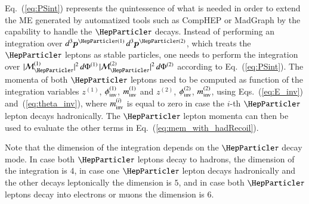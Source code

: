 Eq.~(\ref{eq:PSint}) represents the quintessence of what is needed 
in order to extend the ME generated by automatized tools such as
CompHEP or MadGraph
by the capability to handle the $\Pgt$ decays.
Instead of performing an integration over $d^{3}\bm{p}^{\Pgt(1)} \,
d^{3}\bm{p}^{\Pgt(2)}$, which treats the $\Pgt$ leptons as stable particles,
one needs to perform the integration over $\vert
\mathcal{M}^{(1)}_{\Pgt} \vert^{2} \, d\Phi^{(1)} \, \vert
\mathcal{M}^{(2)}_{\Pgt} \vert^{2} \, d\Phi^{(2)}$ according to
Eq.~(\ref{eq:PSint}).
The momenta of both $\Pgt$ leptons need to be computed as
function of the integration variables $z^{(1)}$, $\phi_{\textrm{inv}}^{(1)}$,
$m_{\textrm{inv}}^{(1)}$ and $z^{(2)}$, $\phi_{\textrm{inv}}^{(2)}$,
$m_{\textrm{inv}}^{(2)}$, using Eqs.~(\ref{eq:E_inv})
and~(\ref{eq:theta_inv}),
where $m_{\textrm{inv}}^{(i)}$ is equal to zero in case the $i$-th $\Pgt$ lepton
decays hadronically.
The $\Pgt$ lepton momenta can then be used to evaluate the other
terms in Eq.~(\ref{eq:mem_with_hadRecoil}).

Note that the dimension of the integration depends on the $\Pgt$ decay
mode.
In case both $\Pgt$ leptons decay to hadrons, the dimension of the
integration is $4$, in case one $\Pgt$ lepton decays hadronically and
the other decays leptonically the dimension is $5$, and in case both
$\Pgt$ leptons decay into electrons or muons the dimension is $6$.
 
